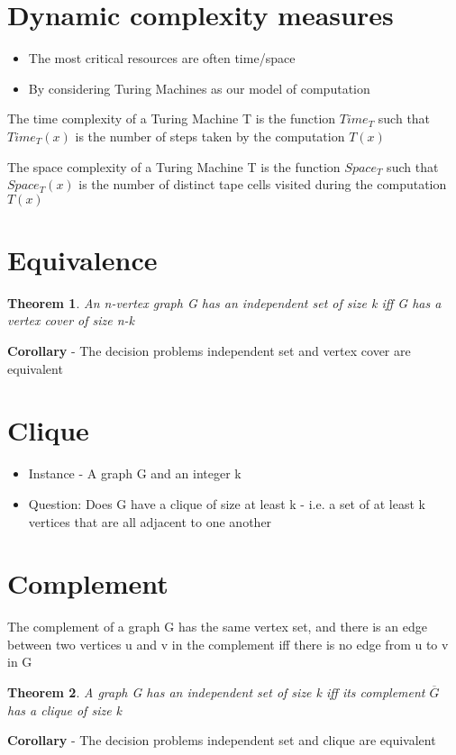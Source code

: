 \documentclass{article}[18pt]
\newtheorem{theorem}{Theorem}
\begin{document}
\section{Dynamic complexity measures}
\begin{itemize}
	\item The most critical resources are often time/space
	\item By considering Turing Machines as our model of computation
\end{itemize}
\begin{definition}
The time complexity of a Turing Machine T is the function $Time_T$ such that $Time_T(x)$ is the number of steps taken by the computation $T(x)$
\end{definition}

\begin{definition}
The space complexity of a Turing Machine T is the function $Space_T$ such that $Space_T(x)$ is the number of distinct tape cells visited during the computation $T(x)$
\end{definition}

\section{Equivalence}
\begin{theorem}
An n-vertex graph G has an independent set of size k iff G has a vertex cover of size n-k
\end{theorem}
\textbf{Corollary} - The decision problems independent set and vertex cover are equivalent
\section{Clique}
\begin{itemize}
	\item Instance - A graph G and an integer k
	\item Question: Does G have a clique of size at least k - i.e. a set of at least k vertices that are all adjacent to one another
\end{itemize}
\section{Complement}
\begin{definition}[Complement]
The complement of a graph G has the same vertex set, and there is an edge between two vertices u and v in the complement iff there is no edge from u to v in G
\end{definition}
\begin{theorem}
A graph G has an independent set of size k iff its complement $\overline{G}$ has a clique of size k
\end{theorem}
\textbf{Corollary} - The decision problems independent set and clique are equivalent
\end{document}
